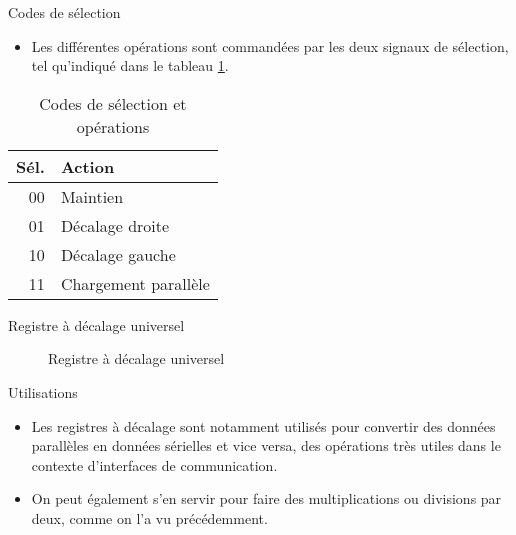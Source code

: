 \documentclass[presentation]{beamer}
\begin{document}
\begin{frame}[label={sec:orgd230653}]{Codes de sélection}
\begin{itemize}
\item Les différentes opérations sont commandées par les deux signaux de sélection, tel qu'indiqué dans le tableau \ref{tab:org3752892}.
\end{itemize}

\begin{table}[htbp]
\caption{\label{tab:org3752892}Codes de sélection et opérations}
\centering
\begin{tabular}{rl}
Sél. & Action\\
\hline
00 & Maintien\\
01 & Décalage droite\\
10 & Décalage gauche\\
11 & Chargement parallèle\\
\end{tabular}
\end{table}
\end{frame}

\begin{frame}[label={sec:org90e9235}]{Registre à décalage universel}
\begin{figure}[htbp]
\centering

\caption{\label{fig:orgf3112d5}Registre à décalage universel}
\end{figure} 
\end{frame}

\begin{frame}[label={sec:org29e3f65}]{Utilisations}
\begin{itemize}
\item Les registres à décalage sont notamment utilisés pour convertir des données parallèles en données sérielles et vice versa, des opérations très utiles dans le contexte d'interfaces de communication.

\item On peut également s'en servir pour faire des multiplications ou divisions par deux, comme on l'a vu précédemment.
\end{itemize}
\end{frame}
\end{document}
